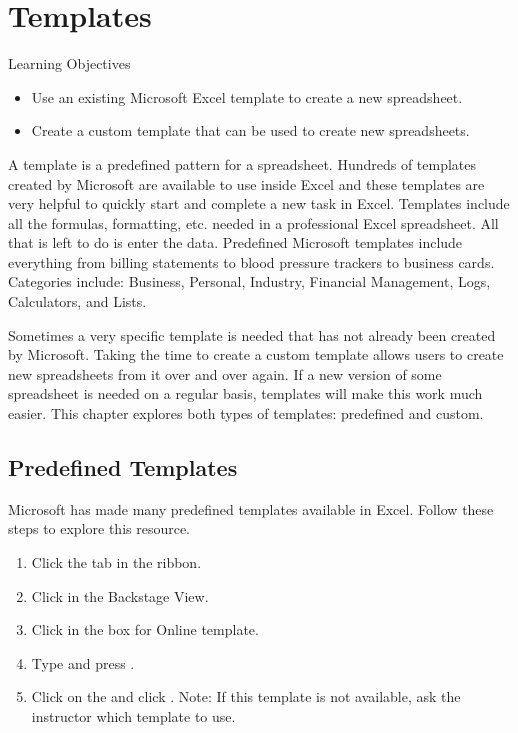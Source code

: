 \section{Templates}

\begin{center}
	\begin{objbox}{Learning Objectives}
		\begin{itemize}
			\setlength{\itemsep}{0pt}
			\setlength{\parskip}{0pt}
			\setlength{\parsep}{0pt}

			\item Use an existing Microsoft Excel template to create a new spreadsheet.
			\item Create a custom template that can be used to create new spreadsheets.
		
		\end{itemize}
	\end{objbox}
\end{center}

A template is a predefined pattern for a spreadsheet. Hundreds of templates created by Microsoft are available to use inside Excel and these templates are very helpful to quickly start and complete a new task in Excel. Templates include all the formulas, formatting, etc. needed in a professional Excel spreadsheet. All that is left to do is enter the data. Predefined Microsoft templates include everything from billing statements to blood pressure trackers to business cards. Categories include: Business, Personal, Industry, Financial Management, Logs, Calculators, and Lists.

Sometimes a very specific template is needed that has not already been created by Microsoft. Taking the time to create a custom template allows users to create new spreadsheets from it over and over again. If a new version of some spreadsheet is needed on a regular basis, templates will make this work much easier. This chapter explores both types of templates: predefined and custom.

\subsection{Predefined Templates}

Microsoft has made many predefined templates available in Excel. Follow these steps to explore this resource.

\begin{enumerate}
	\item Click the  tab in the ribbon.
	\item Click  in the Backstage View.
	\item Click in the  box for Online template.
	\item Type  and press .
	\item Click on the  and click . Note: If this template is not available, ask the instructor which template to use.
\end{enumerate}

